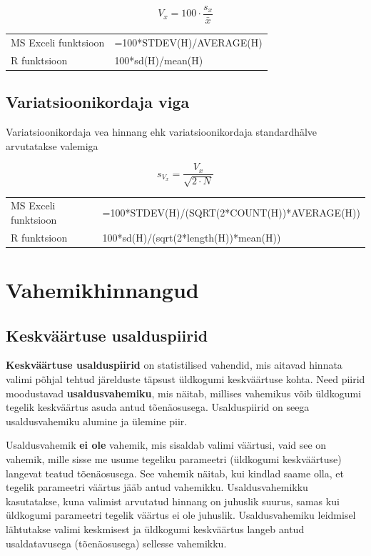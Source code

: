 \documentclass[
]{book}
\theoremstyle{definition}
\theoremstyle{definition}
\theoremstyle{definition}
\theoremstyle{definition}
\theoremstyle{remark}
\begin{document}
\[V_x = 100 \cdot \frac{s_x}{\bar{x}}\]

\begin{tabular}{ll}
MS Exceli funktsioon & =100*STDEV(H)/AVERAGE(H)\\
R funktsioon & 100*sd(H)/mean(H) \\
\end{tabular}

\subsection{Variatsioonikordaja viga}\label{variatsioonikordaja-viga}

Variatsioonikordaja vea hinnang ehk variatsioonikordaja standardhälve arvutatakse valemiga

\[s_{V_x} = \frac{V_x}{\sqrt{2 \cdot N}}\]

\begin{tabular}{ll}
MS Exceli funktsioon & =100*STDEV(H)/(SQRT(2*COUNT(H))*AVERAGE(H)) \\
R funktsioon & 100*sd(H)/(sqrt(2*length(H))*mean(H)) \\
\end{tabular}

\section{Vahemikhinnangud}\label{vahemikhinnangud}

\subsection{Keskväärtuse usalduspiirid}\label{keskvuxe4uxe4rtuse-usalduspiirid}

\textbf{Keskväärtuse usalduspiirid} on statistilised vahendid, mis aitavad hinnata valimi põhjal tehtud järelduste täpsust üldkogumi keskväärtuse kohta. Need piirid moodustavad \textbf{usaldusvahemiku}, mis näitab, millises vahemikus võib üldkogumi tegelik keskväärtus asuda antud tõenäosusega. Usalduspiirid on seega usaldusvahemiku alumine ja ülemine piir.

Usaldusvahemik \textbf{ei ole} vahemik, mis sisaldab valimi väärtusi, vaid see on vahemik, mille sisse me usume tegeliku parameetri (üldkogumi keskväärtuse) langevat teatud tõenäosusega. See vahemik näitab, kui kindlad saame olla, et tegelik parameetri väärtus jääb antud vahemikku. Usaldusvahemikku kasutatakse, kuna valimist arvutatud hinnang on juhuslik suurus, samas kui üldkogumi parameetri tegelik väärtus ei ole juhuslik. Usaldusvahemiku leidmisel lähtutakse valimi keskmisest ja üldkogumi keskväärtus langeb antud usaldatavusega (tõenäosusega) sellesse vahemikku.
\end{document}
